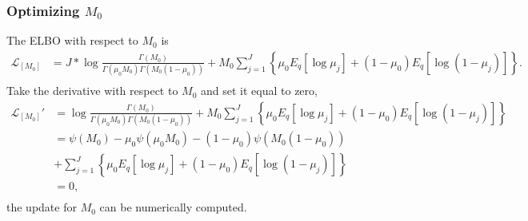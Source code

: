 \documentclass[11pt,reqno]{amsart}
\begin{document}
\subsubsection{Optimizing $ M_0 $}
The ELBO with respect to $ M_0 $ is
\begin{equation}
\begin{split}
\label{M_0}
\mathcal{L}_{[M_0]}
&=J* \log \frac{ \Gamma(M_0) } { \Gamma(\mu_0 M_0) \Gamma(M_0 (1-\mu_0))}
+ M_0 \sum_{j=1}^{J} \left\lbrace \mu_0E_q  \left[ \log \mu_j \right] + ( 1 - \mu_0) E_q  \left[ \log (1 - \mu_j)\right]\right\rbrace.  \\
\end{split}
\end{equation}
Take the derivative with respect to $ M_0 $ and set it equal to zero,
\begin{equation}
\begin{split}
\label{M_0}
\mathcal{L}_{[M_0]}'
&= \log \frac{ \Gamma(M_0) } { \Gamma(\mu_0 M_0) \Gamma(M_0 (1-\mu_0))}
+ M_0 \sum_{j=1}^{J} \left\lbrace \mu_0E_q  \left[ \log \mu_j \right] + ( 1 - \mu_0) E_q  \left[ \log (1 - \mu_j)\right]\right\rbrace  \\
&= \psi(M_0)  - \mu_0 \psi(\mu_0 M_0) - (1-\mu_0) \psi(M_0 (1-\mu_0))  \\
\quad &+ \sum_{j=1}^{J} \left\lbrace \mu_0E_q  \left[ \log \mu_j \right] + ( 1 - \mu_0) E_q  \left[ \log (1 - \mu_j)\right]\right\rbrace \\
&=0, \\
\end{split}
\end{equation}
the update for $ M_0 $ can be numerically computed.
\end{document}
